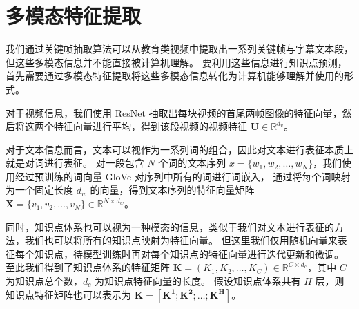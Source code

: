 \section{多模态特征提取}
    我们通过关键帧抽取算法可以从教育类视频中提取出一系列关键帧与字幕文本段，但这些多模态信息并不能直接被计算机理解。
    要利用这些信息进行知识点预测，首先需要通过多模态特征提取将这些多模态信息转化为计算机能够理解并使用的形式。

    对于视频信息，我们使用 ResNet\cite{He2016DeepRL} 抽取出每块视频的首尾两帧图像的特征向量，然后将这两个特征向量进行平均，得到该段视频的视频特征 $\boldsymbol{U} \in \mathbb{R}^{d_v}$。

    对于文本信息而言，文本可以视作为一系列词的组合，因此对文本进行表征本质上就是对词进行表征。
    对一段包含 $N$ 个词的文本序列 $x = \{w_1, w_2, \dots, w_N\}$，我们使用经过预训练的词向量 GloVe\cite{Pennington2014GloVeGV} 对序列中所有的词进行词嵌入，
    通过将每个词映射为一个固定长度 $d_w$ 的向量，得到文本序列的特征向量矩阵 $\boldsymbol{X} = \{v_1, v_2, \dots, v_N\} \in \mathbb{R}^{N \times d_{w}}$。

    同时，知识点体系也可以视为一种模态的信息，类似于我们对文本进行表征的方法，我们也可以将所有的知识点映射为特征向量。
    但这里我们仅用随机向量来表征每个知识点，待模型训练时再对每个知识点的特征向量进行迭代更新和微调。
    至此我们得到了知识点体系的特征矩阵 $\boldsymbol{K} = (K_1, K_2, \dots, K_C) \in \mathbb{R}^{C \times d_c}$，其中 $C$ 为知识点总个数，$d_c$ 为知识点特征向量的长度。
    假设知识点体系共有 $H$ 层，则知识点特征矩阵也可以表示为 $\boldsymbol{K} = [\boldsymbol{K^1}; \boldsymbol{K^2}; \dots; \boldsymbol{K^H}]$。


